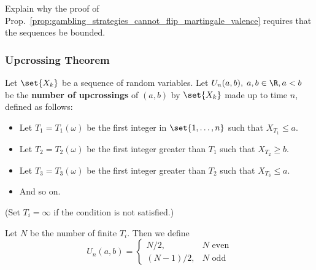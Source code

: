 \documentclass{article} %
\begin{document}
\begin{exercise}
Explain why the proof of Prop.~\ref{prop:gambling_strategies_cannot_flip_martingale_valence} requires that the sequences be bounded. 	
\end{exercise}


\subsubsection{Upcrossing Theorem}

\begin{definition}
Let $\set{X_k}$ be a sequence of random variables. Let $U_n(a,b), \; a,b \in \R, a<b$ be the \textbf{number of upcrossings} of $(a,b)$ by $\set{X_k}$ made up to time $n$, defined as follows:

\begin{itemize}
\item Let $T_1 = T_1(\omega)$ be the first integer in $\set{1,\hdots,n}$ such that $X_{T_1} \leq a$.
\item Let $T_2 = T_2(\omega)$ be the first integer greater than $T_1$ such that $X_{T_2} \geq b$.
\item Let $T_3 = T_3(\omega)$ be the first integer greater than $T_2$ such that $X_{T_3} \leq a$.
\item And so on.	
\end{itemize}
(Set $T_i = \infty$ if the condition is not satisfied.)

Let $N$ be the number of finite $T_i$.  Then  we define 
\[ U_n(a,b) = 
\begin{cases}
N/2, & N \text{ even} \\	
(N-1)/2, & N \text{ odd} 
 \end{cases}
\]
\end{definition}
\end{document}
